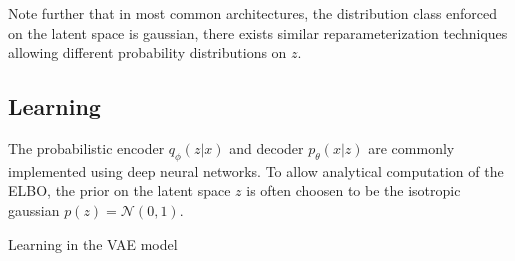 Note further that in most common architectures, the distribution class enforced on the latent space is gaussian, there exists similar reparameterization techniques allowing different probability distributions on $z$.








\newpage

\subsection{Learning}
\label{sub:vae_learning}
The probabilistic encoder $q_\phi(z|x)$ and decoder $p_\theta(x|z)$ are commonly implemented using deep neural networks.
To allow analytical computation of the ELBO, the prior on the latent space $z$ is often choosen to be the isotropic gaussian $p(z) = \mathcal{N}(0,1)$.



\begin{algorithm}
  \caption{Learning in the VAE model}
  \label{alg:vae}
  \begin{algorithmic}[1]
    \EndWhile
  \end{algorithmic}
\end{algorithm}


